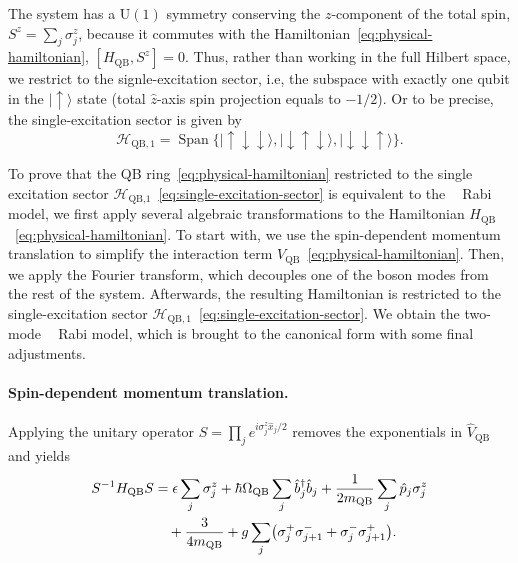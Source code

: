\documentclass[reprint, aps, prx, amsmath, amssymb, longbibliography, superscriptaddress]{revtex4-2}
\DeclareMathOperator{\Zthree}{\mathbb{Z}_3}
\begin{document}
The system has a $\mathrm{U(1)}$ symmetry conserving the $z$-component of the total  spin, $ S^z = \sum_j
\sigma_j^z$, because it commutes with the Hamiltonian~\eqref{eq:physical-hamiltonian}, $[H_{\text{QB}}, S^z ] = 0$. Thus, rather than working in the full Hilbert space, we restrict to the signle-excitation sector, i.e, the subspace with exactly one qubit in the $|\uparrow\rangle$ state (total $\hat z$-axis spin projection equals to $-1/2$). Or to be precise, the single-excitation sector is given by
\begin{equation}
\label{eq:single-excitation-sector}
  \mathcal H_{\text{QB},1} = \operatorname{Span}\bigl\{ |
    \uparrow\downarrow\downarrow\rangle,
    |\downarrow\uparrow\downarrow\rangle,
    |\downarrow\downarrow\uparrow\rangle \bigr\}.
\end{equation}

To prove that the QB ring~\eqref{eq:physical-hamiltonian} restricted to the single excitation sector $\mathcal{H}_{\text{QB,1}}$~\eqref{eq:single-excitation-sector} is equivalent to the $\Zthree$ Rabi model, we first apply several algebraic transformations to the Hamiltonian $H_{\text{QB}}$~\eqref{eq:physical-hamiltonian}. To start with, we use the spin-dependent momentum translation to simplify the interaction term $V_{\text{QB}}$~\eqref{eq:physical-hamiltonian}. Then, we apply the Fourier transform, which decouples one of the boson modes from the rest of the system. Afterwards, the resulting Hamiltonian is restricted to the single-excitation sector $\mathcal{H}_{\text{QB},1}$~\eqref{eq:single-excitation-sector}. We obtain the two-mode $\Zthree$ Rabi model, which is brought to the canonical form with some final adjustments.

\paragraph{Spin-dependent momentum translation.}
Applying the unitary operator
$S = \prod_j e^{ i \sigma_j^z \hat x_j / 2 }$ removes the exponentials in
$\hat V_{\text{QB}}$ and yields
\begin{align}
\label{eq:after-momentum-translation}
    S^{-1} H_{\text{QB}} S &= \epsilon \sum_{j} \sigma_j^z
      + \hbar \Omega_{\text{QB}} \sum_j \hat b_j^{\dagger} \hat b_j
      + \frac{1}{2 m_{\text{QB}}} \sum_j \hat p_j \sigma_j^z \notag
      \\
      &\quad + \frac{3}{4 m_{\text{QB}}}
      + g \sum_{j}
        \bigl( \sigma_j^{+} \sigma_{j+1}^{-} + \sigma_j^{-} \sigma_{j+1}^{+} \bigr).
\end{align}
\end{document}
